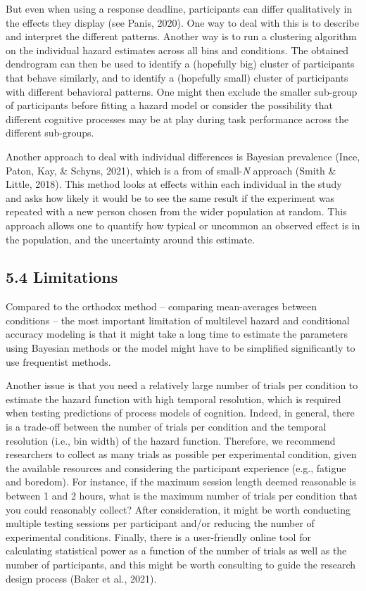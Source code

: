 \documentclass[
  man, donotrepeattitle,floatsintext]{apa6}
\begin{document}
But even when using a response deadline, participants can differ qualitatively in the effects they display (see Panis, 2020). One way to deal with this is to describe and interpret the different patterns. Another way is to run a clustering algorithm on the individual hazard estimates across all bins and conditions. The obtained dendrogram can then be used to identify a (hopefully big) cluster of participants that behave similarly, and to identify a (hopefully small) cluster of participants with different behavioral patterns. One might then exclude the smaller sub-group of participants before fitting a hazard model or consider the possibility that different cognitive processes may be at play during task performance across the different sub-groups.

Another approach to deal with individual differences is Bayesian prevalence (Ince, Paton, Kay, \& Schyns, 2021), which is a from of small-\emph{N} approach (Smith \& Little, 2018). This method looks at effects within each individual in the study and asks how likely it would be to see the same result if the experiment was repeated with a new person chosen from the wider population at random. This approach allows one to quantify how typical or uncommon an observed effect is in the population, and the uncertainty around this estimate.

\subsection{5.4 Limitations}\label{limitations}

Compared to the orthodox method -- comparing mean-averages between conditions -- the most important limitation of multilevel hazard and conditional accuracy modeling is that it might take a long time to estimate the parameters using Bayesian methods or the model might have to be simplified significantly to use frequentist methods.

Another issue is that you need a relatively large number of trials per condition to estimate the hazard function with high temporal resolution, which is required when testing predictions of process models of cognition. Indeed, in general, there is a trade-off between the number of trials per condition and the temporal resolution (i.e., bin width) of the hazard function. Therefore, we recommend researchers to collect as many trials as possible per experimental condition, given the available resources and considering the participant experience (e.g., fatigue and boredom). For instance, if the maximum session length deemed reasonable is between 1 and 2 hours, what is the maximum number of trials per condition that you could reasonably collect? After consideration, it might be worth conducting multiple testing sessions per participant and/or reducing the number of experimental conditions. Finally, there is a user-friendly online tool for calculating statistical power as a function of the number of trials as well as the number of participants, and this might be worth consulting to guide the research design process (Baker et al., 2021).
\end{document}
